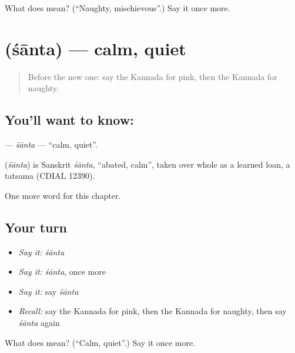 \begin{tcolorbox}[breakable,colback=teal!4,colframe=teal!35!black,title={Before you move on}]
What does  mean? (\textquotedblleft{}Naughty, mischievous\textquotedblright{}.) Say it once more.
\end{tcolorbox}
\section[\texorpdfstring{\kn{ಶಾಂತ} (śānta)}{ಶಾಂತ (śānta)}]{ (śānta) — calm, quiet}

\label{lesson:KA-C255-santa}



\begin{quote}
Before the new one: say the Kannada for pink, then the Kannada for naughty.
\end{quote}

\subsection*{You'll want to know: }
\textbf{} — \emph{śānta} — \textquotedblleft{}calm, quiet\textquotedblright{}.

\begin{cousinweb}
\textbf{} (\emph{śānta}) is Sanskrit \emph{śānta}, \textquotedblleft{}abated, calm\textquotedblright{}, taken over whole as a learned loan, a tatsama (CDIAL 12390).
\end{cousinweb}

\begin{grammarlens}[title={What you've built}]
One more word for this chapter.
\end{grammarlens}

\subsection*{Your turn}
\begin{itemize}
\raggedright
  \item \emph{Say it:} \emph{śānta}
  \item \emph{Say it:} \emph{śānta}, once more
  \item \emph{Say it:} say \emph{śānta}
  \item \emph{Recall:} say the Kannada for pink, then the Kannada for naughty, then say \emph{śānta} again
\end{itemize}

\begin{tcolorbox}[breakable,colback=teal!4,colframe=teal!35!black,title={Before you move on}]
What does  mean? (\textquotedblleft{}Calm, quiet\textquotedblright{}.) Say it once more.
\end{tcolorbox}
